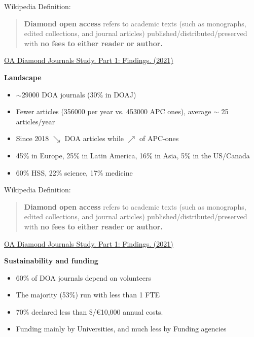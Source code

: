 \documentclass[10pt,compress,serif,aspectratio=169]{beamer}
\begin{document}

\begin{frame}[t]%
 \vskip1cm%

Wikipedia Definition:\newline \newline
 \begin{quote}
   \textbf{Diamond open access} refers to academic texts (such as monographs, edited collections, and journal articles) published/distributed/preserved with \textbf{no fees to either reader or author.} \newline
 \end{quote}
 \pause
\href{https://doi.org/10.5281/zenodo.4558704}{OA Diamond Journals Study. Part 1: Findings. (2021)\newline}

\textbf{Landscape}\\
\begin{itemize}
\item $\sim 29000$ DOA journals (30\% in DOAJ)
\item Fewer articles (356000 per year vs. 453000 APC ones), average $\sim$ 25 articles/year
\item Since 2018 $\searrow$ DOA articles while $\nearrow$ of APC-ones
\item 45\% in Europe, 25\% in Latin America, 16\% in Asia, 5\% in the US/Canada
\item 60\% HSS, 22\% science, 17\% medicine
\end{itemize}

\end{frame}


\begin{frame}[t]%
 \vskip1cm%

Wikipedia Definition:\newline \newline
 \begin{quote}
   \textbf{Diamond open access} refers to academic texts (such as monographs, edited collections, and journal articles) published/distributed/preserved with \textbf{no fees to either reader or author.} \newline
 \end{quote}

\href{https://doi.org/10.5281/zenodo.4558704}{OA Diamond Journals Study. Part 1: Findings. (2021)\newline}

\textbf{Sustainability and funding}\\
\begin{itemize}
  \item 60\% of DOA journals depend on volunteers
  \item The majority (53\%) run with less than 1 FTE
  \item 70\% declared less than \$/€10,000 annual costs.
  \item Funding mainly by Universities, and much less by Funding agencies
\end{itemize}
\end{frame}
\end{document}
